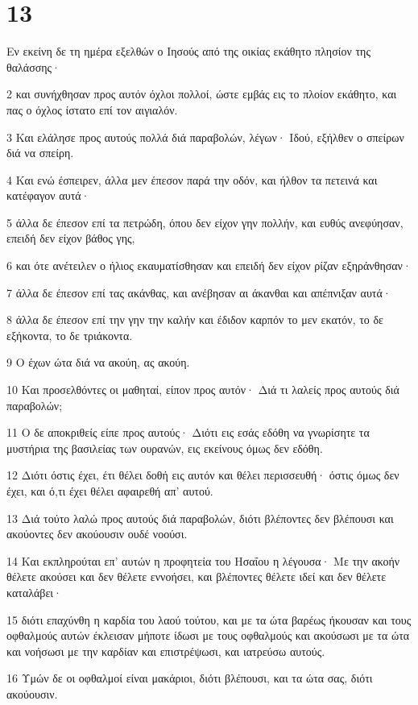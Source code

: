 \chapter{13}

\par Εν εκείνη δε τη ημέρα εξελθών ο Ιησούς από της οικίας εκάθητο πλησίον της θαλάσσης·
\par 2 και συνήχθησαν προς αυτόν όχλοι πολλοί, ώστε εμβάς εις το πλοίον εκάθητο, και πας ο όχλος ίστατο επί τον αιγιαλόν.
\par 3 Και ελάλησε προς αυτούς πολλά διά παραβολών, λέγων· Ιδού, εξήλθεν ο σπείρων διά να σπείρη.
\par 4 Και ενώ έσπειρεν, άλλα μεν έπεσον παρά την οδόν, και ήλθον τα πετεινά και κατέφαγον αυτά·
\par 5 άλλα δε έπεσον επί τα πετρώδη, όπου δεν είχον γην πολλήν, και ευθύς ανεφύησαν, επειδή δεν είχον βάθος γης,
\par 6 και ότε ανέτειλεν ο ήλιος εκαυματίσθησαν και επειδή δεν είχον ρίζαν εξηράνθησαν·
\par 7 άλλα δε έπεσον επί τας ακάνθας, και ανέβησαν αι άκανθαι και απέπνιξαν αυτά·
\par 8 άλλα δε έπεσον επί την γην την καλήν και έδιδον καρπόν το μεν εκατόν, το δε εξήκοντα, το δε τριάκοντα.
\par 9 Ο έχων ώτα διά να ακούη, ας ακούη.
\par 10 Και προσελθόντες οι μαθηταί, είπον προς αυτόν· Διά τι λαλείς προς αυτούς διά παραβολών;
\par 11 Ο δε αποκριθείς είπε προς αυτούς· Διότι εις εσάς εδόθη να γνωρίσητε τα μυστήρια της βασιλείας των ουρανών, εις εκείνους όμως δεν εδόθη.
\par 12 Διότι όστις έχει, έτι θέλει δοθή εις αυτόν και θέλει περισσευθή· όστις όμως δεν έχει, και ό,τι έχει θέλει αφαιρεθή απ' αυτού.
\par 13 Διά τούτο λαλώ προς αυτούς διά παραβολών, διότι βλέποντες δεν βλέπουσι και ακούοντες δεν ακούουσιν ουδέ νοούσι.
\par 14 Και εκπληρούται επ' αυτών η προφητεία του Ησαΐου η λέγουσα· Με την ακοήν θέλετε ακούσει και δεν θέλετε εννοήσει, και βλέποντες θέλετε ιδεί και δεν θέλετε καταλάβει·
\par 15 διότι επαχύνθη η καρδία του λαού τούτου, και με τα ώτα βαρέως ήκουσαν και τους οφθαλμούς αυτών έκλεισαν μήποτε ίδωσι με τους οφθαλμούς και ακούσωσι με τα ώτα και νοήσωσι με την καρδίαν και επιστρέψωσι, και ιατρεύσω αυτούς.
\par 16 Υμών δε οι οφθαλμοί είναι μακάριοι, διότι βλέπουσι, και τα ώτα σας, διότι ακούουσιν.
